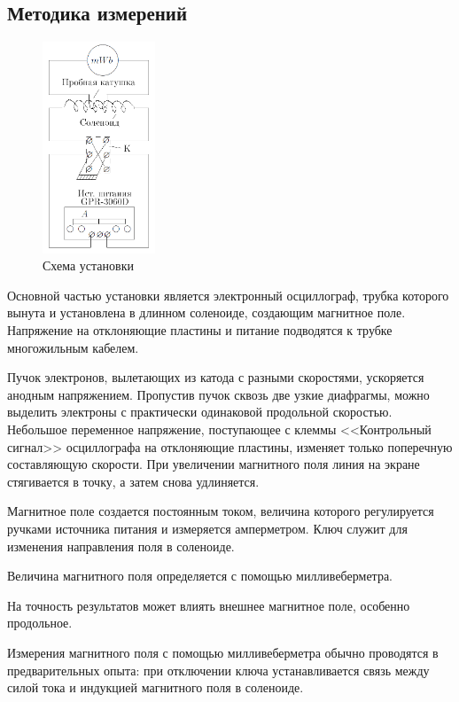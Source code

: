 \documentclass[a4paper, 12pt]{article}
\begin{document}
\subsection{Методика измерений}

\begin{figure}
  \begin{center}
    \includegraphics[width = 0.3\textwidth]{1.png}
  \end{center}
  \caption{Схема установки}
  \label{ris1}
\end{figure}
Основной частью установки является электронный осциллограф, трубка которого вынута и установлена в длинном соленоиде, создающим магнитное поле. Напряжение на отклоняющие пластины и питание подводятся к трубке многожильным кабелем.

Пучок электронов, вылетающих из катода с разными скоростями, ускоряется анодным напряжением. Пропустив пучок сквозь две узкие диафрагмы, можно выделить электроны с практически одинаковой продольной скоростью. Небольшое переменное напряжение, поступающее с клеммы <<Контрольный сигнал>> осциллографа на отклоняющие пластины, изменяет только поперечную составляющую скорости. При увеличении магнитного поля линия на экране стягивается в точку, а затем снова удлиняется. 

Магнитное поле создается постоянным током, величина которого регулируется ручками источника питания и измеряется амперметром. Ключ служит для изменения направления поля в соленоиде.

Величина магнитного поля определяется с помощью милливеберметра.

На точность результатов может влиять внешнее магнитное поле, особенно продольное. 

Измерения магнитного поля с помощью милливеберметра обычно проводятся в предварительных опыта: при отключении ключа устанавливается связь между силой тока и индукцией магнитного поля в соленоиде. 
\end{document}
